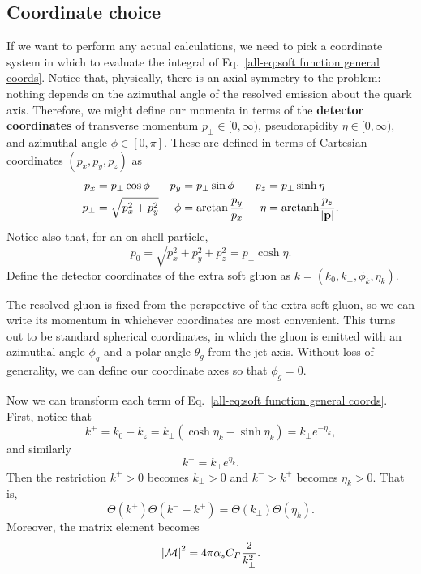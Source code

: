 \documentclass[../thesis.tex]{subfiles}
\providecommand{\arctanh}{\mathrm{arctanh}}
\providecommand{\cM}{\mathcal{M}}
\begin{document}
\subsection{Coordinate choice}
	If we want to perform any actual calculations, we need to pick a coordinate system in which to evaluate the integral of Eq.~\ref{all-eq:soft function general coords}. Notice that, physically, there is an axial symmetry to the problem: nothing depends on the azimuthal angle of the resolved emission about the quark axis. Therefore, we might define our momenta in terms of the \textbf{detector coordinates} of transverse momentum $p_\perp \in [0, \infty)$, pseudorapidity $\eta \in [0, \infty)$, and azimuthal angle $\phi \in [0, \pi]$. These are defined in terms of Cartesian coordinates $(p_x, p_y, p_z)$ as
	\begin{align}
		p_x &= p_\perp \cos\phi & p_y &= p_\perp \sin\phi & p_z &= p_\perp \sinh\eta \\
		p_\perp &= \sqrt{p_x^2 + p_y^2} & \phi &= \arctan\frac{p_y}{p_x} & \eta &= \arctanh\frac{p_z}{\abs{\vb{p}}}.
	\end{align}
	Notice also that, for an on-shell particle,
	\begin{equation}
		p_0 = \sqrt{p_x^2 + p_y^2 + p_z^2} = p_\perp \cosh\eta.
	\end{equation}
	Define the detector coordinates of the extra soft gluon as $k = (k_0, k_\perp, \phi_k, \eta_k)$.

	The resolved gluon is fixed from the perspective of the extra-soft gluon, so we can write its momentum in whichever coordinates are most convenient. This turns out to be standard spherical coordinates, in which the gluon is emitted with an azimuthal angle $\phi_g$ and a polar angle $\theta_g$ from the jet axis. Without loss of generality, we can define our coordinate axes so that $\phi_g = 0$.

	Now we can transform each term of Eq.~\ref{all-eq:soft function general coords}. First, notice that
	\begin{equation}
		k^+ = k_0 - k_z = k_\perp (\cosh\eta_k - \sinh\eta_k) = k_\perp e^{-\eta_k},
	\end{equation}
	and similarly
	\begin{equation}
		k^- = k_\perp e^{\eta_k}.
	\end{equation}
	Then the restriction $k^+ > 0$ becomes $k_\perp > 0$ and $k^- > k^+$ becomes $\eta_k > 0$. That is,
	\begin{equation}\label{all-eq:phase space constraints specific coords}
		\Theta(k^+) \Theta(k^- - k^+) = \Theta(k_\perp)\Theta(\eta_k).
	\end{equation}
	Moreover, the matrix element becomes
	\begin{equation}\label{all-eq:matrix element specific coords}
		\abs{\cM}^2 = 4\pi\alpha_s C_F \frac{2}{k_\perp^2}.
	\end{equation}
\end{document}

